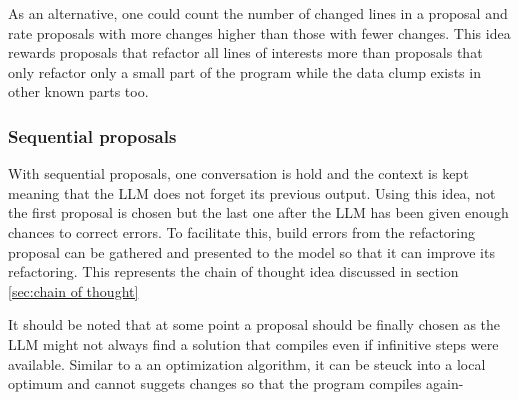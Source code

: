 As an alternative, one could count the number of changed lines in a proposal and rate proposals with more changes higher than those with fewer changes. This idea rewards proposals that refactor all lines of interests more than proposals that only refactor only a small part of the program while the data clump exists in other known parts too. 

\subsubsection{Sequential proposals}

With sequential proposals, one conversation is hold and the context is kept meaning that the \ac{LLM} does not forget its previous output. Using this idea, not the first proposal is chosen but the last one after the \ac{LLM} has been given enough chances to correct errors.  To facilitate this, build errors from the refactoring proposal can be gathered and presented to the model so that it can improve its refactoring. This represents the chain of thought idea discussed in section \ref{sec:chain of thought}

It should be noted that at some point a proposal should be finally chosen as the \ac{LLM} might not always find a solution that compiles even if infinitive steps were available. Similar to a an optimization algorithm, it can be steuck into a local optimum and cannot suggets changes so that the program compiles again-  
